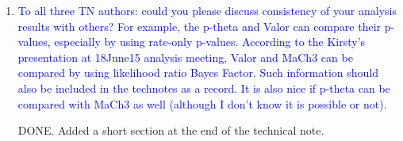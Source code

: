 \documentclass[final]{elsarticle}
\begin{document}
\begin{enumerate}

\item 

\textcolor{blue}
{To all three TN authors:
could you please discuss consistency of your analysis results with others?
For example, the p-theta and Valor can compare their p-values, especially 
by using rate-only p-values.  
According to the Kirsty's presentation at 18June15 analysis meeting, Valor and MaCh3
can be compared by using likelihood ratio Bayes Factor.  Such information should also be
included in the technotes as a record.
It is also nice if p-theta can be compared with MaCh3 as well (although I don't know it is possible or not).}

DONE. Added a short section at the end of the technical note.

\end{enumerate}
\end{document}
